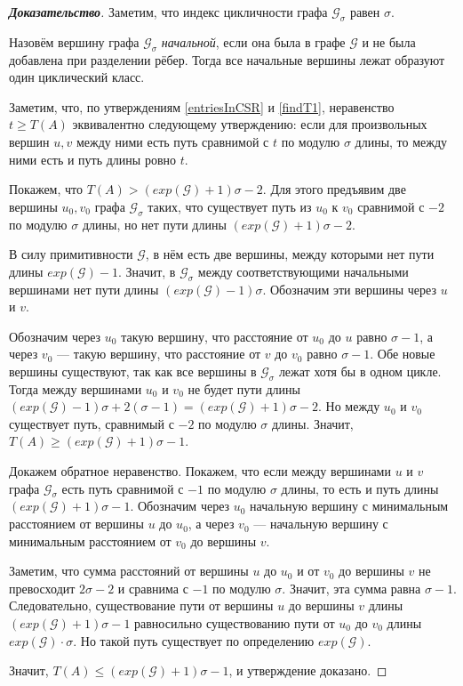 \documentclass[12pt]{article}
\theoremstyle{definition}
\begin{document}
\begin{proof}[\textbf{Доказательство}] 
Заметим, что индекс цикличности графа $\mathcal{G}_\sigma$ равен $\sigma$.

Назовём вершину графа $\mathcal{G}_\sigma$ \textit{начальной}, если она была в графе $\mathcal{G}$ и не была добавлена при разделении рёбер. Тогда все начальные вершины лежат образуют один циклический класс.

Заметим, что, по утверждениям \ref{entriesInCSR} и \ref{findT1}, неравенство $t \ge T(A)$ эквивалентно следующему утверждению: если для произвольных вершин $u, v$ между ними есть путь сравнимой с $t$ по модулю $\sigma$ длины, то между ними есть и путь длины ровно $t$.

Покажем, что $T(A) > (exp(\mathcal{G}) + 1)\sigma - 2$. Для этого предъявим две вершины $u_0, v_0$ графа $\mathcal{G}_\sigma$ таких, что существует путь из $u_0$ к $v_0$ сравнимой с $-2$ по модулю $\sigma$ длины, но нет пути длины $(exp(\mathcal{G}) + 1)\sigma - 2$.

В силу примитивности $\mathcal{G}$, в нём есть две вершины, между которыми нет пути длины $exp(\mathcal{G}) - 1$. Значит, в $\mathcal{G}_\sigma$ между соответствующими начальными вершинами нет пути длины $(exp(\mathcal{G}) - 1)\sigma$. Обозначим эти вершины через $u$ и $v$.

Обозначим через $u_0$ такую вершину, что расстояние от $u_0$ до $u$ равно $\sigma - 1$, а через $v_0$ --- такую вершину, что расстояние от $v$ до $v_0$ равно $\sigma - 1$. Обе новые вершины существуют, так как все вершины в $\mathcal{G}_{\sigma}$ лежат хотя бы в одном цикле. Тогда между вершинами $u_0$ и $v_0$ не будет пути длины $(exp(\mathcal{G})- 1)\sigma + 2(\sigma - 1) = (exp(\mathcal{G}) + 1)\sigma - 2$. Но между $u_0$ и $v_0$ существует путь, сравнимый с $-2$ по модулю $\sigma$ длины. Значит, $T(A) \ge (exp(\mathcal{G}) + 1)\sigma - 1$.

Докажем обратное неравенство. Покажем, что если между вершинами $u$ и $v$ графа $\mathcal{G}_\sigma$ есть путь сравнимой с $-1$ по модулю $\sigma$ длины, то есть и путь длины $(exp(\mathcal{G}) + 1)\sigma - 1$. Обозначим через $u_0$ начальную вершину с минимальным расстоянием от вершины $u$ до $u_0$, а через $v_0$ --- начальную вершину с минимальным расстоянием от $v_0$ до вершины $v$.

Заметим, что сумма расстояний от вершины $u$ до $u_0$ и от $v_0$ до вершины $v$ не превосходит $2\sigma - 2$ и сравнима с $-1$ по модулю $\sigma$. Значит, эта сумма равна $\sigma - 1$. Следовательно, существование пути от вершины $u$ до вершины $v$ длины $(exp(\mathcal{G}) + 1)\sigma - 1$ равносильно существованию пути от $u_0$ до $v_0$ длины $exp(\mathcal{G}) \cdot \sigma$. Но такой путь существует по определению $exp(\mathcal{G})$.

Значит, $T(A) \le (exp(\mathcal{G}) + 1)\sigma - 1$, и утверждение доказано.
\end{proof}
\end{document}
